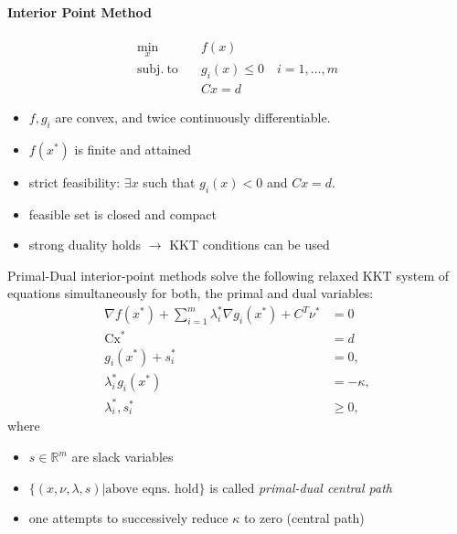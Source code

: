 \paragraph{Interior Point Method}
\begin{align*}
    \min_x \quad            & f(x)                             \\
    \mathrm{subj.\ to}\quad & g_i(x)\leq 0 \quad i=1,\ldots, m \\
                            & Cx = d
\end{align*}
\begin{itemize}
    \item $f, g_i$ are convex, and twice continuously differentiable.
    \item $f(x^*)$ is finite and attained
    \item strict feasibility: $\exists x$ such that $g_i(x) < 0$ and $Cx = d$.
    \item feasible set is closed and compact
    \item strong duality holds $\to$ KKT conditions can be used
\end{itemize}

\newpar{}

Primal-Dual interior-point methods solve the following relaxed KKT system of equations simultaneously for both, the primal and dual variables:
\begin{align*}
    \nabla f(x^{*})+\sum_{i=1}^{m}\lambda_{i}^{*}\nabla g_{i}(x^{*})+C^{T}\nu^{*} & =0        \\
    \mathrm{Cx^*}                                                                 & =d        \\
    g_i(x^*)+s_i^*                                                                & =0,       \\
    \lambda_{i}^{*}g_{i}(x^{*})                                                   & =-\kappa, \\
    \lambda_{i}^{*},s_{i}^{*}                                                     & \geq0,
\end{align*}
where
\begin{itemize}
    \item $s\in \mathbb{R}^m$ are slack variables
    \item $\{(x,\nu,\lambda,s)|\text{above eqns.\ hold}\}$ is called \textit{primal-dual central path}
    \item one attempts to successively reduce $\kappa$ to zero (central path)
\end{itemize}

